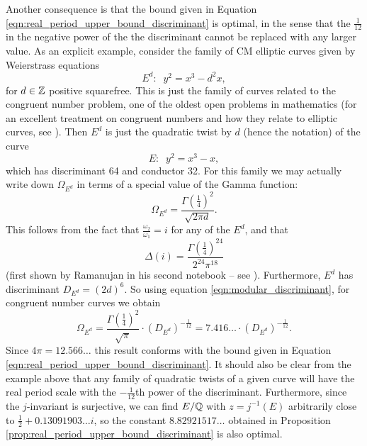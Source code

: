 Another consequence is that the bound given in Equation \ref{eqn:real_period_upper_bound_discriminant} is optimal, in the sense that the $\frac{1}{12}$ in the negative power of the the discriminant cannot be replaced with any larger value. As an explicit example, consider the family of CM elliptic curves given by Weierstrass equations
\begin{equation}
E^d: \;\; y^2 = x^3 - d^2 x,
\end{equation}
for $d \in\mathbb{Z}$ positive squarefree. This is just the family of curves related to the congruent number problem, one of the oldest open problems in mathematics (for an excellent treatment on congruent numbers and how they relate to elliptic curves, see \cite{Kob-2012}). Then $E^{d}$ is just the quadratic twist by $d$ (hence the notation) of the curve
\begin{equation}
E: \;\; y^2 = x^3-x,
\end{equation}
which has discriminant 64 and conductor 32. For this family we may actually write down $\Omega_{E^d}$ in terms of a special value of the Gamma function:
\begin{equation}
\Omega_{E^d} = \frac{\Gamma(\frac{1}{4})^2}{\sqrt{2\pi d}}.
\end{equation}
This follows from the fact that $\frac{\omega_2}{\omega_1} = i$ for any of the $E^d$, and that
\begin{equation}
\Delta(i) = \frac{\Gamma(\frac{1}{4})^{24}}{2^{24}\pi^{18}}
\end{equation}
(first shown by Ramanujan in his second notebook -- see \cite{BeZh-1992}). Furthermore, $E^{d}$ has discriminant $D_{E^{d}} = (2d)^6$. So using equation \ref{eqn:modular_discriminant}, for congruent number curves we obtain
\begin{equation}
\Omega_{E^d} = \frac{\Gamma(\frac{1}{4})^2}{\sqrt{\pi}} \cdot (D_{E^d})^{-\frac{1}{12}} = 7.416\ldots \cdot (D_{E^d})^{-\frac{1}{12}}.
\end{equation}
Since $4\pi = 12.566\ldots$ this result conforms with the bound given in Equation \ref{eqn:real_period_upper_bound_discriminant}. It should also be clear from the example above that any family of quadratic twists of a given curve will have the real period scale with the $-\frac{1}{12}$th power of the discriminant. Furthermore, since the $j$-invariant is surjective, we can find $E/\mathbb{Q}$ with $z=j^{-1}(E)$ arbitrarily close to $\frac{1}{2}+0.13091903\ldots i$, so the constant $8.82921517\ldots$ obtained in Proposition \ref{prop:real_period_upper_bound_discriminant} is also optimal. \\


